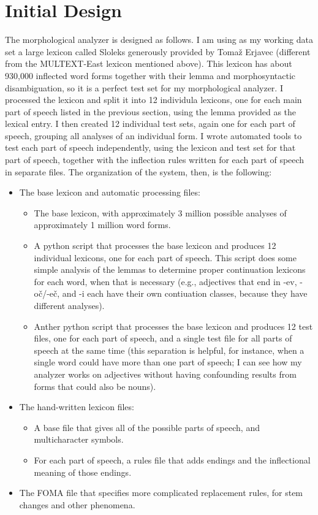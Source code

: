 \documentclass[11pt,letterpaper]{article}
\begin{document}
\section{Initial Design}

The morphological analyzer is designed as follows.  I am using as my working
data set a large lexicon called Sloleks generously provided by Toma\v{z}
Erjavec (different from the MULTEXT-East lexicon mentioned above).  This
lexicon has about 930,000 inflected word forms together with their lemma and
morphosyntactic disambiguation, so it is a perfect test set for my
morphological analyzer.  I processed the lexicon and split it into 12
individula lexicons, one for each main part of speech listed in the previous
section, using the lemma provided as the lexical entry.  I then created 12
individual test sets, again one for each part of speech, grouping all analyses
of an individual form.  I wrote automated tools to test each part of speech
independently, using the lexicon and test set for that part of speech, together
with the inflection rules written for each part of speech in separate files.
The organization of the system, then, is the following:

\begin{itemize}
  \item The base lexicon and automatic processing files:
    \begin{itemize}
      \item The base lexicon, with approximately 3 million possible analyses of
        approximately 1 million word forms.
      \item A python script that processes the base lexicon and produces 12
        individual lexicons, one for each part of speech.  This script does
        some simple analysis of the lemmas to determine proper continuation
        lexicons for each word, when that is necessary (e.g., adjectives that
        end in -ev, -o\v{c}/-e\v{c}, and -i each have their own contiuation
        classes, because they have different analyses).
      \item Anther python script that processes the base lexicon and produces
        12 test files, one for each part of speech, and a single test file for
        all parts of speech at the same time (this separation is helpful, for
        instance, when a single word could have more than one part of speech; I
        can see how my analyzer works on adjectives without having confounding
        results from forms that could also be nouns).
    \end{itemize}
  \item The hand-written lexicon files:
    \begin{itemize}
      \item A base file that gives all of the possible parts of speech, and
        multicharacter symbols.
      \item For each part of speech, a rules file that adds endings and the
        inflectional meaning of those endings.
    \end{itemize}
  \item The FOMA file that specifies more complicated replacement rules, for
    stem changes and other phenomena.
\end{itemize}
\end{document}
